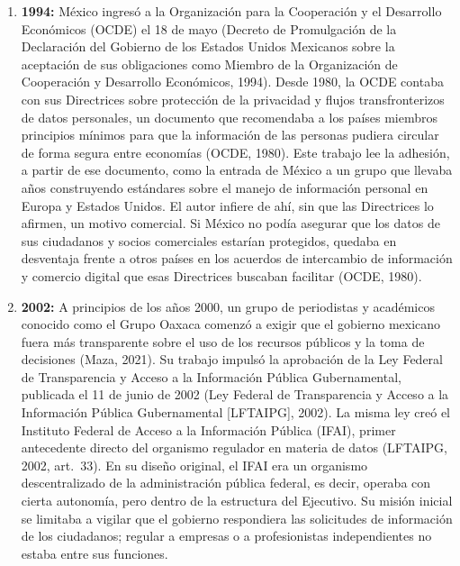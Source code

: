 \documentclass[12pt, a4paper]{article}
\begin{document}
\begin{enumerate}[label=\Roman*.]
 
  \item \textbf{1994:} México ingresó a la Organización para la
  Cooperación y el Desarrollo Económicos (OCDE) el 18 de mayo (Decreto de
  Promulgación de la Declaración del Gobierno de los Estados Unidos
  Mexicanos sobre la aceptación de sus obligaciones como Miembro de la
  Organización de Cooperación y Desarrollo Económicos, 1994). Desde
  1980, la OCDE contaba con sus Directrices sobre protección de la
  privacidad y flujos transfronterizos de datos personales, un
  documento que recomendaba a los países miembros principios mínimos
  para que la información de las personas pudiera circular de forma
  segura entre economías (OCDE, 1980). Este trabajo lee la adhesión,
  a partir de ese documento, como la entrada de México a un grupo que
  llevaba años construyendo estándares sobre el manejo de información
  personal en Europa y Estados Unidos. El autor infiere de ahí, sin
  que las Directrices lo afirmen, un motivo comercial. Si México no
  podía asegurar que los datos de sus ciudadanos y socios comerciales
  estarían protegidos, quedaba en desventaja frente a otros países en
  los acuerdos de intercambio de información y comercio digital que
  esas Directrices buscaban facilitar (OCDE, 1980).
 
  \item \textbf{2002:} A principios de los años 2000, un grupo de
  periodistas y académicos conocido como el Grupo Oaxaca comenzó a
  exigir que el gobierno mexicano fuera más transparente sobre el uso
  de los recursos públicos y la toma de decisiones (Maza, 2021). Su
  trabajo impulsó la aprobación de la Ley Federal de
  Transparencia y Acceso a la Información Pública Gubernamental,
  publicada el 11 de junio de 2002 (Ley Federal de Transparencia y
  Acceso a la Información Pública Gubernamental [LFTAIPG], 2002). La
  misma ley creó el Instituto Federal de Acceso a la Información
  Pública (IFAI), primer antecedente directo del organismo regulador
  en materia de datos (LFTAIPG, 2002, art.~33). En su diseño
  original, el IFAI era un organismo descentralizado de la
  administración pública federal, es decir, operaba con cierta
  autonomía, pero dentro de la estructura del Ejecutivo. Su misión
  inicial se limitaba a vigilar que el gobierno respondiera las
  solicitudes de información de los ciudadanos; regular a empresas
  o a profesionistas independientes no estaba entre sus funciones.
 

\end{enumerate}
\end{document}
